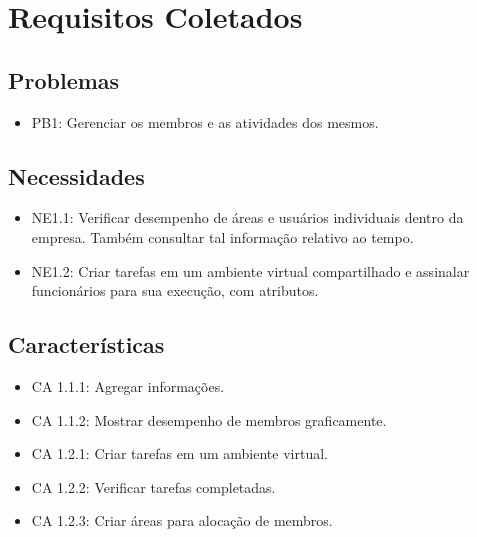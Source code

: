 \chapter{Requisitos Coletados}
\label{collection}

\section{Problemas}
\begin{itemize}
\item PB1: Gerenciar os membros e as atividades dos mesmos.
\end{itemize}

\section{Necessidades}
\begin{itemize}
\item NE1.1: Verificar desempenho de áreas e usuários individuais dentro da empresa. Também consultar tal informação relativo ao tempo.
\item NE1.2: Criar tarefas em um ambiente virtual compartilhado e assinalar funcionários para sua execução, com atributos.
\end{itemize}

\section{Características}
\begin{itemize}
\item CA 1.1.1: Agregar informações.
\item CA 1.1.2: Mostrar desempenho de membros graficamente.
\item CA 1.2.1: Criar tarefas em um ambiente virtual.
\item CA 1.2.2: Verificar tarefas completadas.
\item CA 1.2.3: Criar áreas para alocação de membros.
\end{itemize}

